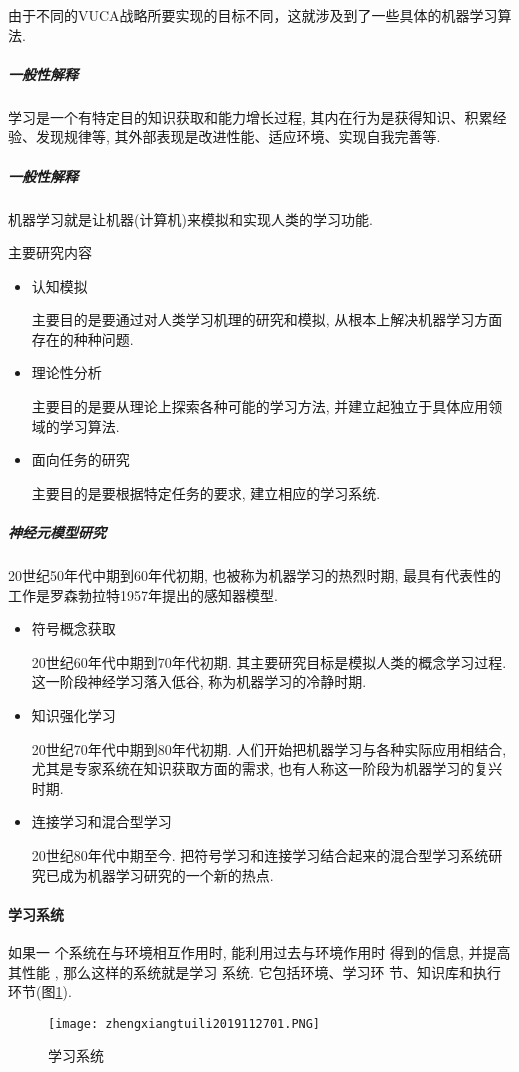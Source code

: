 由于不同的VUCA战略所要实现的目标不同，这就涉及到了一些具体的机器学习算法.
\subparagraph{一般性解释}
学习是一个有特定目的知识获取和能力增长过程, 其内在行为是获得知识、积累经验、发现规律等, 其外部表现是改进性能、适应环境、实现自我完善等.
\subparagraph{一般性解释}
机器学习就是让机器(计算机)来模拟和实现人类的学习功能.

主要研究内容
\begin{itemize}
\item 认知模拟

    主要目的是要通过对人类学习机理的研究和模拟, 从根本上解决机器学习方面存在的种种问题.
\item 理论性分析

     主要目的是要从理论上探索各种可能的学习方法, 并建立起独立于具体应用领域的学习算法.
\item 面向任务的研究

    主要目的是要根据特定任务的要求, 建立相应的学习系统.
\end{itemize}
\subparagraph{神经元模型研究}
 20世纪50年代中期到60年代初期, 也被称为机器学习的热烈时期, 最具有代表性的工作是罗森勃拉特1957年提出的感知器模型.
\begin{itemize}
\item 符号概念获取

    20世纪60年代中期到70年代初期. 其主要研究目标是模拟人类的概念学习过程. 这一阶段神经学习落入低谷, 称为机器学习的冷静时期.
\item 知识强化学习

    20世纪70年代中期到80年代初期. 人们开始把机器学习与各种实际应用相结合, 尤其是专家系统在知识获取方面的需求, 也有人称这一阶段为机器学习的复兴时期.
\item 连接学习和混合型学习

    20世纪80年代中期至今. 把符号学习和连接学习结合起来的混合型学习系统研究已成为机器学习研究的一个新的热点.
\end{itemize}
\paragraph{学习系统}
如果一 个系统在与环境相互作用时, 能利用过去与环境作用时 得到的信息, 并提高其性能 , 那么这样的系统就是学习 系统. 它包括环境、学习环 节、知识库和执行环节(图\ref{AI32fig2701}).
\begin{figure}[H]
\centering
\texttt{[image: zhengxiangtuili2019112701.PNG]}
\caption{学习系统}
\label{AI32fig2701}
\end{figure}

